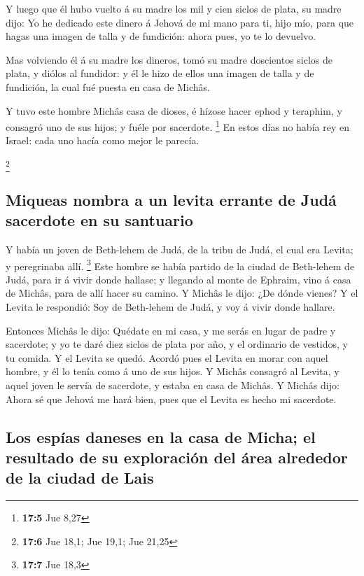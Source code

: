  Y luego que él hubo vuelto á su madre los mil y cien siclos
de plata, su madre dijo: Yo he dedicado este dinero á Jehová de mi mano
para ti, hijo mío, para que hagas una imagen de talla y de fundición:
ahora pues, yo te lo devuelvo.

 Mas volviendo él á su madre los dineros, tomó su madre
doscientos siclos de plata, y diólos al fundidor: y él le hizo de ellos
una imagen de talla y de fundición, la cual fué puesta en casa de
Michâs.

 Y tuvo este hombre Michâs casa de dioses, é hízose hacer
ephod y teraphim, y consagró uno de sus hijos; y fuéle por sacerdote.
\footnote{\textbf{17:5} Jue 8,27}  En estos días no había
rey en Israel: cada uno hacía como mejor le parecía.

\footnote{\textbf{17:6} Jue 18,1; Jue 19,1; Jue 21,25}

\hypertarget{miqueas-nombra-a-un-levita-errante-de-juduxe1-sacerdote-en-su-santuario}{%
\subsection{Miqueas nombra a un levita errante de Judá sacerdote en su
santuario}\label{miqueas-nombra-a-un-levita-errante-de-juduxe1-sacerdote-en-su-santuario}}

 Y había un joven de Beth-lehem de Judá, de la tribu de
Judá, el cual era Levita; y peregrinaba allí. \footnote{\textbf{17:7}
  Jue 18,3}  Este hombre se había partido de la ciudad de
Beth-lehem de Judá, para ir á vivir donde hallase; y llegando al monte
de Ephraim, vino á casa de Michâs, para de allí hacer su camino.
 Y Michâs le dijo: ¿De dónde vienes? Y el Levita le
respondió: Soy de Beth-lehem de Judá, y voy á vivir donde hallare.

 Entonces Michâs le dijo: Quédate en mi casa, y me serás en
lugar de padre y sacerdote; y yo te daré diez siclos de plata por año, y
el ordinario de vestidos, y tu comida. Y el Levita se quedó.
 Acordó pues el Levita en morar con aquel hombre, y él lo
tenía como á uno de sus hijos.  Y Michâs consagró al
Levita, y aquel joven le servía de sacerdote, y estaba en casa de
Michâs.  Y Michâs dijo: Ahora sé que Jehová me hará bien,
pues que el Levita es hecho mi sacerdote.

\hypertarget{los-espuxedas-daneses-en-la-casa-de-micha-el-resultado-de-su-exploraciuxf3n-del-uxe1rea-alrededor-de-la-ciudad-de-lais}{%
\subsection{Los espías daneses en la casa de Micha; el resultado de su
exploración del área alrededor de la ciudad de
Lais}\label{los-espuxedas-daneses-en-la-casa-de-micha-el-resultado-de-su-exploraciuxf3n-del-uxe1rea-alrededor-de-la-ciudad-de-lais}}

